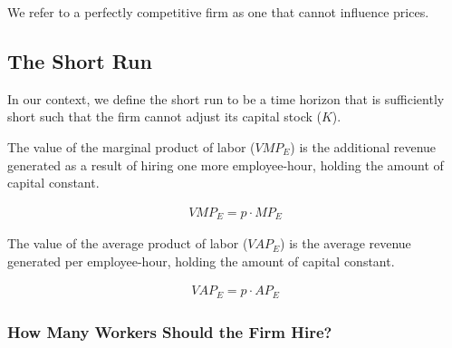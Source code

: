 \begin{definition}

    We refer to a perfectly competitive firm as 
    one that cannot influence prices. 

\end{definition}

\subsection{The Short Run}

\begin{definition} 
    
    In our context, we define the short run to be a time horizon
    that is sufficiently short such that the firm 
    cannot adjust its capital stock ($K$).

\end{definition}

\begin{definition} 

    The value of the marginal product of labor ($VMP_E$)
    is the additional revenue generated
    as a result of hiring one more
    employee-hour, holding the amount
    of capital constant.

    \begin{align}
        VMP_E = p \cdot MP_E
    \end{align}
    
\end{definition}

\begin{definition}
    
    The value of the average product of labor ($VAP_E$)
    is the average revenue generated per employee-hour,
    holding the amount of capital constant.

    \begin{align}
        VAP_E = p \cdot AP_E
    \end{align}
    
\end{definition}

\subsubsection{How Many Workers Should the Firm Hire?}

